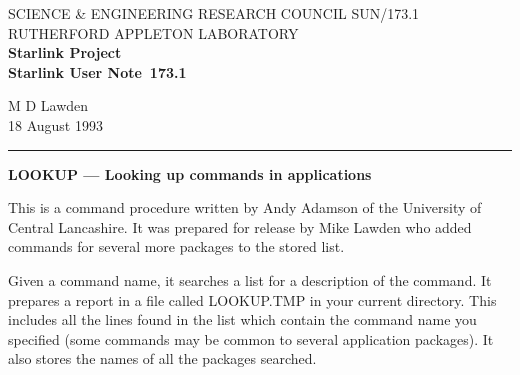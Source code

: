 \pagestyle{myheadings}

\newcommand{\stardoccategory}  {Starlink User Note}
\newcommand{\stardocinitials}  {SUN}
\newcommand{\stardocnumber}    {173.1}
\newcommand{\stardocauthors}   {M D Lawden}
\newcommand{\stardocdate}      {18 August 1993}
\newcommand{\stardoctitle}     {LOOKUP --- Looking up commands in applications}

\newcommand{\stardocname}{\stardocinitials /\stardocnumber}
\renewcommand{\_}{{\tt\char'137}}     %
\markright{\stardocname}
\setlength{\textwidth}{160mm}
\setlength{\textheight}{230mm}
\setlength{\topmargin}{-2mm}
\setlength{\oddsidemargin}{0mm}
\setlength{\evensidemargin}{0mm}
\setlength{\parindent}{0mm}
\setlength{\parskip}{\medskipamount}
\setlength{\unitlength}{1mm}



\thispagestyle{empty}
SCIENCE \& ENGINEERING RESEARCH COUNCIL \hfill \stardocname\\
RUTHERFORD APPLETON LABORATORY\\
{\large\bf Starlink Project\\}
{\large\bf \stardoccategory\ \stardocnumber}
\begin{flushright}
\stardocauthors\\
\stardocdate
\end{flushright}
\vspace{-4mm}
\rule{\textwidth}{0.5mm}
\vspace{5mm}
\begin{center}
{\Large\bf \stardoctitle}
\end{center}
\vspace{5mm}

This is a command procedure written by Andy Adamson of the University of
Central Lancashire.
It was prepared for release by Mike Lawden who added commands for several more
packages to the stored list.

Given a command name, it searches a list for a description of the command.
It prepares a report in a file called LOOKUP.TMP in your current directory.
This includes all the lines found in the list which contain the command name
you specified (some commands may be common to several application packages).
It also stores the names of all the packages searched.

